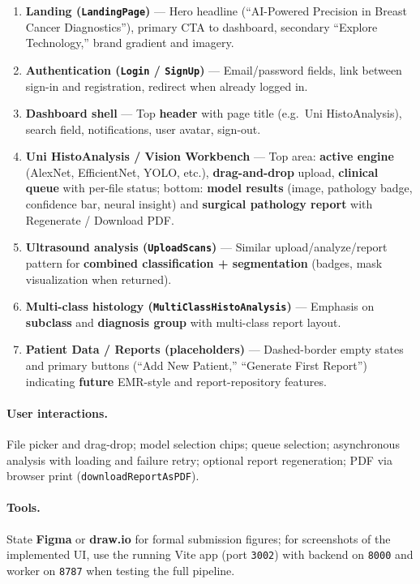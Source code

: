 \documentclass[12pt,a4paper]{report}
\begin{document}
\begin{enumerate}
  \item \textbf{Landing (\texttt{LandingPage})} --- Hero headline (``AI-Powered Precision in Breast Cancer Diagnostics''), primary CTA to dashboard, secondary ``Explore Technology,'' brand gradient and imagery.
  \item \textbf{Authentication (\texttt{Login} / \texttt{SignUp})} --- Email/password fields, link between sign-in and registration, redirect when already logged in.
  \item \textbf{Dashboard shell} --- Top \textbf{header} with page title (e.g.\ Uni HistoAnalysis), search field, notifications, user avatar, sign-out.
  \item \textbf{Uni HistoAnalysis / Vision Workbench} --- Top area: \textbf{active engine} (AlexNet, EfficientNet, YOLO, etc.), \textbf{drag-and-drop} upload, \textbf{clinical queue} with per-file status; bottom: \textbf{model results} (image, pathology badge, confidence bar, neural insight) and \textbf{surgical pathology report} with Regenerate / Download PDF.
  \item \textbf{Ultrasound analysis (\texttt{UploadScans})} --- Similar upload/analyze/report pattern for \textbf{combined classification + segmentation} (badges, mask visualization when returned).
  \item \textbf{Multi-class histology (\texttt{MultiClassHistoAnalysis})} --- Emphasis on \textbf{subclass} and \textbf{diagnosis group} with multi-class report layout.
  \item \textbf{Patient Data / Reports (placeholders)} --- Dashed-border empty states and primary buttons (``Add New Patient,'' ``Generate First Report'') indicating \textbf{future} EMR-style and report-repository features.
\end{enumerate}

\paragraph{User interactions.}
File picker and drag-drop; model selection chips; queue selection; asynchronous analysis with loading and failure retry; optional report regeneration; PDF via browser print (\texttt{downloadReportAsPDF}).

\paragraph{Tools.}
State \textbf{Figma} or \textbf{draw.io} for formal submission figures; for screenshots of the implemented UI, use the running Vite app (port \texttt{3002}) with backend on \texttt{8000} and worker on \texttt{8787} when testing the full pipeline.
\end{document}
